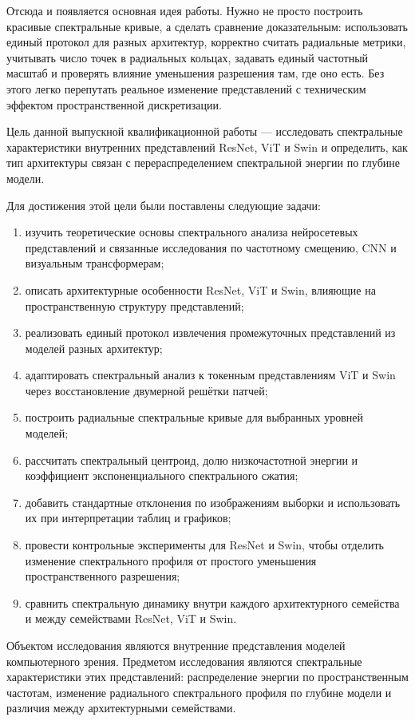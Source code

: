 Отсюда и появляется основная идея работы. Нужно не просто построить красивые спектральные кривые, а сделать сравнение доказательным: использовать единый протокол для разных архитектур, корректно считать радиальные метрики, учитывать число точек в радиальных кольцах, задавать единый частотный масштаб и проверять влияние уменьшения разрешения там, где оно есть. Без этого легко перепутать реальное изменение представлений с техническим эффектом пространственной дискретизации.

Цель данной выпускной квалификационной работы — исследовать спектральные характеристики внутренних представлений ResNet, ViT и Swin и определить, как тип архитектуры связан с перераспределением спектральной энергии по глубине модели.

Для достижения этой цели были поставлены следующие задачи:

\begin{enumerate}
\item изучить теоретические основы спектрального анализа нейросетевых представлений и связанные исследования по частотному смещению, CNN и визуальным трансформерам;
\item описать архитектурные особенности ResNet, ViT и Swin, влияющие на пространственную структуру представлений;
\item реализовать единый протокол извлечения промежуточных представлений из моделей разных архитектур;
\item адаптировать спектральный анализ к токенным представлениям ViT и Swin через восстановление двумерной решётки патчей;
\item построить радиальные спектральные кривые для выбранных уровней моделей;
\item рассчитать спектральный центроид, долю низкочастотной энергии и коэффициент экспоненциального спектрального сжатия;
\item добавить стандартные отклонения по изображениям выборки и использовать их при интерпретации таблиц и графиков;
\item провести контрольные эксперименты для ResNet и Swin, чтобы отделить изменение спектрального профиля от простого уменьшения пространственного разрешения;
\item сравнить спектральную динамику внутри каждого архитектурного семейства и между семействами ResNet, ViT и Swin.
\end{enumerate}

Объектом исследования являются внутренние представления моделей компьютерного зрения. Предметом исследования являются спектральные характеристики этих представлений: распределение энергии по пространственным частотам, изменение радиального спектрального профиля по глубине модели и различия между архитектурными семействами.

